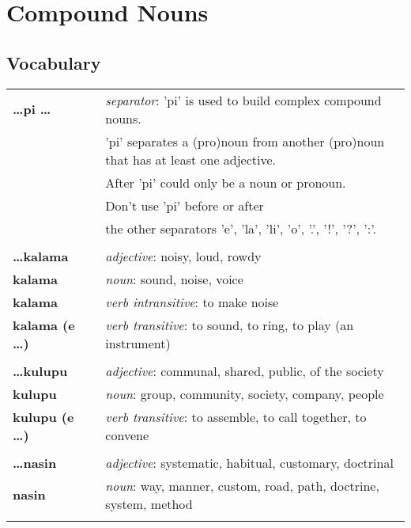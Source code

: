 \section{Compound Nouns}
%
\subsection*{Vocabulary}
%
\begin{supertabular}{p{2,5cm}|ll}
\textbf{\dots pi \dots } && \textit{separator}: 'pi' is used to build complex compound nouns. \\ && 'pi' separates a (pro)noun from another (pro)noun that has at least one adjective. \\ && After 'pi' could only be a noun or pronoun. \\ && Don't use 'pi' before or after \\ && the other separators 'e', 'la', 'li', 'o', '.', '!', '?', ':'.  \\ %
 && \\ %
\textbf{\dots kalama} && \textit{adjective}: noisy, loud, rowdy \\ %
\textbf{kalama} && \textit{noun}: sound, noise, voice \\ 
\textbf{kalama} && \textit{verb intransitive}: to make noise \\ %
\textbf{kalama (e \dots)} && \textit{verb transitive}: to sound, to ring, to play (an instrument) \\ %
 && \\ %
\textbf{\dots kulupu} && \textit{adjective}: communal, shared, public, of the society \\ %
\textbf{kulupu} && \textit{noun}: group, community, society, company, people \\ %
\textbf{kulupu (e \dots)} && \textit{verb transitive}: to assemble, to call together, to convene \\ %
 && \\ %
\textbf{\dots nasin} && \textit{adjective}: systematic, habitual, customary, doctrinal \\ %
\textbf{nasin} && \textit{noun}: way, manner, custom, road, path, doctrine, system, method \\ %
 && \\ %
\end{supertabular} \\
%
\newpage
